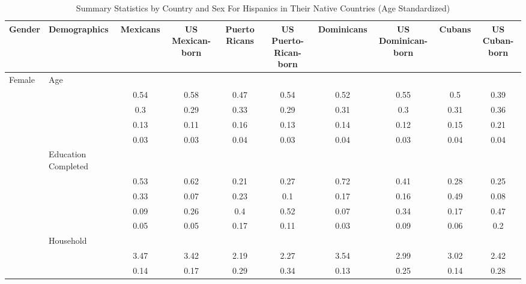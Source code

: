 \begin{table}[ht]
\centering
\caption{Summary Statistics by Country and Sex For Hispanics in Their Native Countries (Age Standardized)} 
\begingroup\small
\begin{tabular}{l>{\raggedright\arraybackslash}p{3.2cm}|cccccccc}
  \hline
Gender & Demographics & Mexicans & US Mexican-born & Puerto Ricans & US Puerto-Rican-born & Dominicans & US Dominican-born & Cubans & US Cuban-born \\ 
  \hline
Female & Age &  &  &  &  &  &  &  &  \\ 
   & \multicolumn{1}{>{\raggedleft\arraybackslash}p{1.5cm}|}{\makebox[1.5cm][r]{60 - 69 }} & 0.54 & 0.58 & 0.47 & 0.54 & 0.52 & 0.55 & 0.5 & 0.39 \\ 
   & \multicolumn{1}{>{\raggedleft\arraybackslash}p{1.5cm}|}{\makebox[1.5cm][r]{70 - 79 }} & 0.3 & 0.29 & 0.33 & 0.29 & 0.31 & 0.3 & 0.31 & 0.36 \\ 
   & \multicolumn{1}{>{\raggedleft\arraybackslash}p{1.5cm}|}{\makebox[1.5cm][r]{80 - 89 }} & 0.13 & 0.11 & 0.16 & 0.13 & 0.14 & 0.12 & 0.15 & 0.21 \\ 
   & \multicolumn{1}{>{\raggedleft\arraybackslash}p{1.5cm}|}{\makebox[1.5cm][r]{90 plus }} & 0.03 & 0.03 & 0.04 & 0.03 & 0.04 & 0.03 & 0.04 & 0.04 \\ 
   & Education Completed &  &  &  &  &  &  &  &  \\ 
   & \multicolumn{1}{>{\raggedleft\arraybackslash}p{3.2cm}|}{\makebox[3.2cm][r]{Less than Primary }} & 0.53 & 0.62 & 0.21 & 0.27 & 0.72 & 0.41 & 0.28 & 0.25 \\ 
   & \multicolumn{1}{>{\raggedleft\arraybackslash}p{1.7cm}|}{\makebox[1.7cm][r]{Primary }} & 0.33 & 0.07 & 0.23 & 0.1 & 0.17 & 0.16 & 0.49 & 0.08 \\ 
   & \multicolumn{1}{>{\raggedleft\arraybackslash}p{2cm}|}{\makebox[2cm][r]{Secondary }} & 0.09 & 0.26 & 0.4 & 0.52 & 0.07 & 0.34 & 0.17 & 0.47 \\ 
   & \multicolumn{1}{>{\raggedleft\arraybackslash}p{2cm}|}{\makebox[2cm][r]{University }} & 0.05 & 0.05 & 0.17 & 0.11 & 0.03 & 0.09 & 0.06 & 0.2 \\ 
   & Household &  &  &  &  &  &  &  &  \\ 
   & \multicolumn{1}{>{\raggedleft\arraybackslash}p{2.7cm}|}{\makebox[2.7cm][r]{Household Size }} & 3.47 & 3.42 & 2.19 & 2.27 & 3.54 & 2.99 & 3.02 & 2.42 \\ 
   & \multicolumn{1}{>{\raggedleft\arraybackslash}p{2.2cm}|}{\makebox[2.2cm][r]{Lives Alone }} & 0.14 & 0.17 & 0.29 & 0.34 & 0.13 & 0.25 & 0.14 & 0.28 \\ 

\end{tabular}
\end{table}
